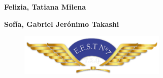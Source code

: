 \documentclass[28pt, a4paper]{report}
\begin{document}
\begin{titlepage}
\begin{center}
            {\Large\textbf{{Felizia, Tatiana Milena}}}\par
            {\Large\textbf{{Sofía, Gabriel Jerónimo Takashi}}}\par
                \vspace{2cm}
            \begin{figure} [!ht]
                \centering
                \includegraphics [width=7cm]{Imagenes/Preface/IMPA.png}
                \label{IMPA}
            \end{figure}
        \end{center}
        
    \end{titlepage}
    
    \tableofcontents
    \newpage

    
    
    
    
\end{document}
